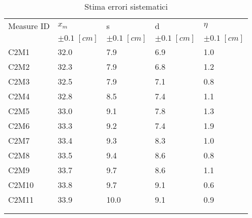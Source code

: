 \begin{longtable}[]{@{}lllll@{}}
    \toprule
    Measure ID & $x_m$ & s & d & $\eta$ \tabularnewline
& $\pm 0.1 \; [cm]$ & $\pm 0.1 \; [cm]$ & $\pm 0.1 \; [cm]$ & $\pm 0.1 \; [cm]$ \tabularnewline
    \midrule
    \endhead
    C2M1 & 32.0 & 7.9 & 6.9 & 1.0 \tabularnewline
    C2M2 & 32.3 & 7.9 & 6.8 & 1.2 \tabularnewline
    C2M3 & 32.5 & 7.9 & 7.1 & 0.8 \tabularnewline
    C2M4 & 32.8 & 8.5 & 7.4 & 1.1 \tabularnewline
    C2M5 & 33.0 & 9.1 & 7.8 & 1.3 \tabularnewline
    C2M6 & 33.3 & 9.2 & 7.4 & 1.9 \tabularnewline
    C2M7 & 33.4 & 9.3 & 8.3 & 1.0 \tabularnewline
    C2M8 & 33.5 & 9.4 & 8.6 & 0.8 \tabularnewline
    C2M9 & 33.7 & 9.7 & 8.6 & 1.1 \tabularnewline
    C2M10 & 33.8 & 9.7 & 9.1 & 0.6 \tabularnewline
    C2M11 & 33.9 & 10.0 & 9.1 & 0.9 \tabularnewline
    \bottomrule
    \label{tab:sd}
    \\
    \caption{Stima errori sistematici}
 \end{longtable}